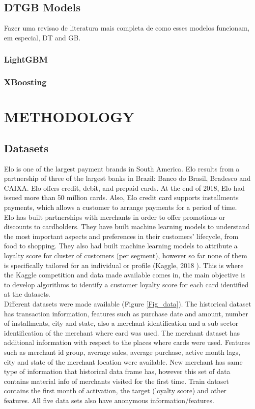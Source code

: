 \documentclass[letterpaper, 10 pt, conference]{ieeeconf}  %
\begin{document}
\subsection{DTGB Models}
Fazer uma revisao de literatura mais completa de como esses modelos funcionam, em especial, DT and GB.

\subsubsection{LightGBM}
\subsubsection{XBoosting}

\section{METHODOLOGY}
\subsection{Datasets}

Elo is one of the largest payment brands in South America. Elo results from a partnership of three of the largest banks in Brazil: Banco do Brasil, Bradesco and CAIXA. Elo offers credit, debit, and prepaid cards. At the end of 2018, Elo had issued more than 50 million cards. Also, Elo credit card supports installments payments, which allows a customer to arrange payments for a period of time.\\

Elo has built partnerships with merchants in order to offer promotions or discounts to cardholders. They have built machine learning models to understand the most important aspects and preferences in their customers’ lifecycle, from food to shopping. They also had built machine learning models to attribute a loyalty score for cluster of customers (per segment), however so far none of them is specifically tailored for an individual or profile (Kaggle, 2018 \cite{Kaggle}). This is where the Kaggle competition and data made available comes in, the main objective is to develop algorithms to identify a customer loyalty score for each card identified at the datasets.\\

Different datasets were made available (Figure \ref{Fig_data}). The historical dataset has transaction information, features such as purchase date and amount, number of installments, city and state, also a merchant identification and a sub sector identification of the merchant where card was used. The merchant dataset has additional information with respect to the places where cards were used. Features such as merchant id group, average sales, average purchase, active month lags, city and state of the merchant location were available. New merchant  has same type of information that historical data frame has, however this set of data contains material info of merchants visited for the first time. Train dataset contains the first month of activation, the target (loyalty score) and other features. All five data sets also have anonymous information/features.\\
\end{document}

